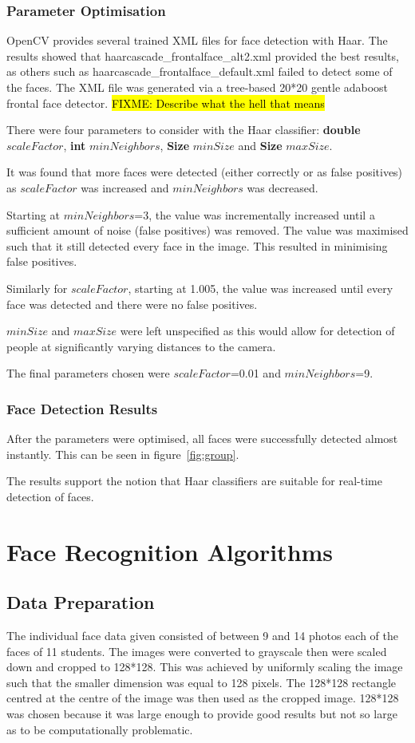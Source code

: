 \documentclass{article}
\begin{document}
\subsubsection{Parameter Optimisation}
OpenCV provides several trained XML files for face detection with Haar. The results showed that haarcascade\_frontalface\_alt2.xml provided the best results, as others such as haarcascade\_frontalface\_default.xml failed to detect some of the faces. The XML file was generated via a tree-based 20*20 gentle adaboost frontal face detector. \hl{FIXME: Describe what the hell that means}

There were four parameters to consider with the Haar classifier: \textbf{double} $scaleFactor$, \textbf{int} $minNeighbors$, \textbf{Size} $minSize$ and \textbf{Size} $maxSize$.

It was found that more faces were detected (either correctly or as false positives) as $scaleFactor$ was increased and $minNeighbors$ was decreased.

Starting at $minNeighbors$=3, the value was incrementally increased until a sufficient amount of noise (false positives) was removed. The value was maximised such that it still detected every face in the image. This resulted in minimising false positives.

Similarly for $scaleFactor$, starting at 1.005, the value was increased until every face was detected and there were no false positives.

$minSize$ and $maxSize$ were left unspecified as this would allow for detection of people at significantly varying distances to the camera.

The final parameters chosen were $scaleFactor$=0.01 and $minNeighbors$=9.

\subsubsection{Face Detection Results}
After the parameters were optimised, all faces were successfully detected almost instantly. This can be seen in figure~\ref{fig:group}.

The results support the notion that Haar classifiers are suitable for real-time detection of faces.

\section{Face Recognition Algorithms}
\subsection{Data Preparation}
The individual face data given consisted of between 9 and 14 photos each of the faces of 11 students. The images were converted to grayscale then were scaled down and cropped to 128*128. This was achieved by uniformly scaling the image such that the smaller dimension was equal to 128 pixels. The 128*128 rectangle centred at the centre of the image was then used as the cropped image. 128*128 was chosen because it was large enough to provide good results but not so large as to be computationally problematic.
\end{document}
